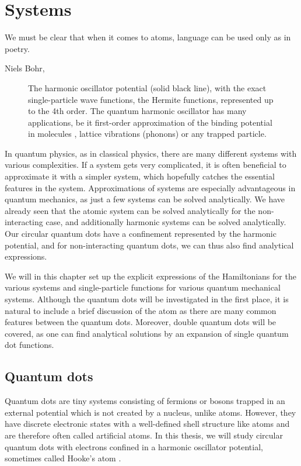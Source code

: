 \chapter{Systems} \label{chp:systems}
\epigraph{We must be clear that when it comes to atoms, language can be used only as in poetry.}{Niels Bohr, \supercite{heisenberg_physics_1971}}
\begin{figure}[H]
	\centering
	
	\caption{The harmonic oscillator potential (solid black line), with the exact single-particle wave functions, the Hermite functions, represented up to the 4th order. The quantum harmonic oscillator has many applications, be it first-order approximation of the binding potential in molecules \supercite{wilson_molecular_1955}, lattice vibrations (phonons) \supercite{cahill_heat_1989} or any trapped particle.}
	\label{fig:harmonicoscillator}
\end{figure}

In quantum physics, as in classical physics, there are many different systems with various complexities. If a system gets very complicated, it is often beneficial to approximate it with a simpler system, which hopefully catches the essential features in the system. Approximations of systems are especially advantageous in quantum mechanics, as just a few systems can be solved analytically. We have already seen that the atomic system can be solved analytically for the non-interacting case, and additionally harmonic systems can be solved analytically. Our circular quantum dots have a confinement represented by the harmonic potential, and for non-interacting quantum dots, we can thus also find analytical expressions. 

We will in this chapter set up the explicit expressions of the Hamiltonians for the various systems and single-particle functions for various quantum mechanical systems. Although the quantum dots will be investigated in the first place, it is natural to include a brief discussion of the atom as there are many common features between the quantum dots. Moreover, double quantum dots will be covered, as one can find analytical solutions by an expansion of single quantum dot functions.

\section{Quantum dots} \label{sec:quantumdots}
Quantum dots are tiny systems consisting of fermions or bosons trapped in an external potential which is not created by a nucleus, unlike atoms. However, they have discrete electronic states with a well-defined shell structure like atoms and are therefore often called artificial atoms. In this thesis, we will study circular quantum dots with electrons confined in a harmonic oscillator potential, sometimes called Hooke's atom \supercite{liang_hookes_2011}. 


